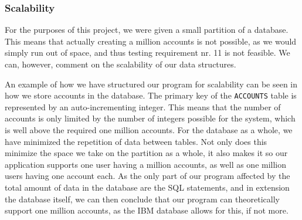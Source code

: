 \subsubsection{Scalability}
For the purposes of this project, we were given a small partition of a database. This means that actually creating a million accounts is not possible, as we would simply run out of space, and thus testing requirement nr. 11 is not feasible. We can, however, comment on the scalability of our data structures. 

An example of how we have structured our program for scalability can be seen in how we store accounts in the database. The primary key of the \texttt{ACCOUNTS} table is represented by an auto-incrementing integer. This means that the number of accounts is only limited by the number of integers possible for the system, which is well above the required one million accounts. For the database as a whole, we have minimized the repetition of data between tables. Not only does this minimize the space we take on the partition as a whole, it also makes it so our application supports one user having a million accounts, as well as one million users having one account each. As the only part of our program affected by the total amount of data in the database are the SQL statements, and in extension the database itself, we can then conclude that our program can theoretically support one million accounts, as the IBM database allows for this, if not more.